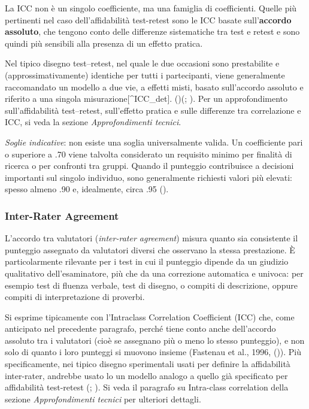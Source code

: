 \documentclass[
  italian,
  letterpaper,
  paper=A4,
  headinclude=on,
  footinclude=on,
  12pt]{scrbook}
\begin{document}
La ICC non è un singolo coefficiente, ma una famiglia di coefficienti.
Quelle più pertinenti nel caso dell'affidabilità test-retest sono le ICC
basate sull'\textbf{accordo assoluto}, che tengono conto delle
differenze sistematiche tra test e retest e sono quindi più sensibili
alla presenza di un effetto pratica.

Nel tipico disegno test--retest, nel quale le due occasioni sono
prestabilite e (approssimativamente) identiche per tutti i partecipanti,
viene generalmente raccomandato un modello a due vie, a effetti misti,
basato sull'accordo assoluto e riferito a una singola
misurazione{[}\^{}ICC\_det{]}.
(\cite{shrout1979intraclass})(\cite{mcgraw1996forming}; \cite{koo2016guideline}).
Per un approfondimento sull'affidabilità test--retest, sull'effetto
pratica e sulle differenze tra correlazione e ICC, si veda la sezione
\emph{Approfondimenti tecnici}.

\emph{Soglie indicative}: non esiste una soglia universalmente valida.
Un coefficiente pari o superiore a .70 viene talvolta considerato un
requisito minimo per finalità di ricerca o per confronti tra gruppi.
Quando il punteggio contribuisce a decisioni importanti sul singolo
individuo, sono generalmente richiesti valori più elevati: spesso almeno
.90 e, idealmente, circa .95 (\cite{nunnally1994psychometric}).

\subsubsection{Inter-Rater Agreement}\label{inter-rater-agreement}

L'accordo tra valutatori (\emph{inter-rater agreement}) misura quanto
sia consistente il punteggio assegnato da valutatori diversi che
osservano la stessa prestazione. È particolarmente rilevante per i test
in cui il punteggio dipende da un giudizio qualitativo dell'esaminatore,
più che da una correzione automatica e univoca: per esempio test di
fluenza verbale, test di disegno, o compiti di descrizione, oppure
compiti di interpretazione di proverbi.

Si esprime tipicamente con l'Intraclass Correlation Coefficient (ICC)
che, come anticipato nel precedente paragrafo, perché tiene conto anche
dell'accordo assoluto tra i valutatori (cioè se assegnano più o meno lo
stesso punteggio), e non solo di quanto i loro punteggi si muovono
insieme (Fastenau et al., 1996, (\cite{slick2006psychometrics})). Più
specificamente, nei tipico disegno sperimentali usati per definire la
affidabilità inter-rater, andrebbe usato lo un modello analogo a quello
già specificato per affidabilità test-retest
(\cite{shrout1979intraclass}; \cite{koo2016guideline}). Si veda il
paragrafo su Intra-class correlation della sezione \emph{Approfondimenti
tecnici} per ulteriori dettagli.
\end{document}
